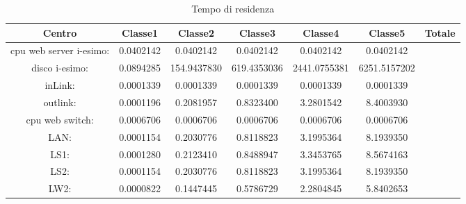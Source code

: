 \begin{table}[H]
\begin{center}\begin{scriptsize}
\begin{tabular}{||c|c|c|c|c|c|c||}
\hline
Centro &Classe1 &Classe2 &Classe3 &Classe4 &Classe5 &Totale\\
\hline
\hline
 cpu web server i-esimo: 	&0.0402142	&0.0402142	&0.0402142	&0.0402142	&0.0402142	\\\hline
 disco i-esimo: 	&0.0894285	&154.9437830	&619.4353036	&2441.0755381	&6251.5157202	\\\hline
 inLink: 	&0.0001339	&0.0001339	&0.0001339	&0.0001339	&0.0001339	\\\hline
 outlink: 	&0.0001196	&0.2081957	&0.8323400	&3.2801542	&8.4003930	\\\hline
 cpu web switch: 	&0.0006706	&0.0006706	&0.0006706	&0.0006706	&0.0006706	\\\hline
 LAN: 	&0.0001154	&0.2030776	&0.8118823	&3.1995364	&8.1939350	\\\hline
 LS1: 	&0.0001280	&0.2123410	&0.8488947	&3.3453765	&8.5674163	\\\hline
 LS2: 	&0.0001154	&0.2030776	&0.8118823	&3.1995364	&8.1939350	\\\hline
 LW2: 	&0.0000822	&0.1447445	&0.5786729	&2.2804845	&5.8402653	\\\hline\hline
\end{tabular}
\end{scriptsize}\end{center}
\caption{Tempo di residenza}
\label{tempodiresidenza}
\end{table}

